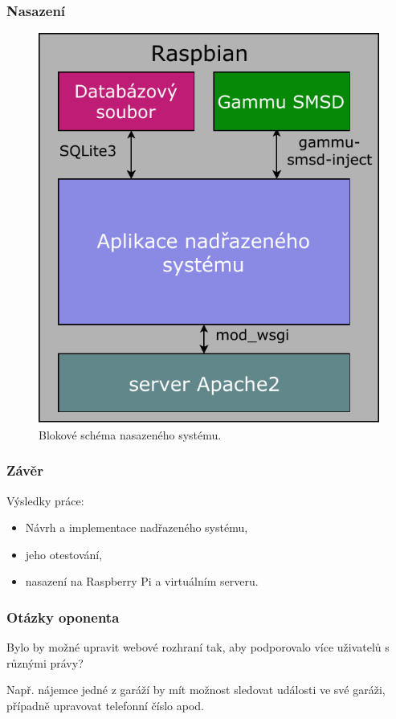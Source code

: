 \documentclass{beamer}
\begin{document}
  \begin{frame}
    \frametitle{Nasazení}

    \begin{figure}
        \includegraphics[scale=0.55]{../images/sw_block.pdf}
        \caption{Blokové schéma nasazeného systému.}
      \end{figure}
  \end{frame}

  \begin{frame}
    \frametitle{Závěr}

    Výsledky práce:

     \begin{itemize}
      \item Návrh a implementace nadřazeného systému,
      \item jeho otestování,
      \item nasazení na Raspberry Pi a virtuálním serveru.
     \end{itemize}
  \end{frame}

  \begin{frame}
    \frametitle{Otázky oponenta}

    Bylo by možné upravit webové rozhraní tak, aby podporovalo více uživatelů s různými právy? 

    Např. nájemce jedné z garáží by mít možnost sledovat události ve své garáži, případně upravovat telefonní číslo apod.

  \end{frame}
\end{document}
